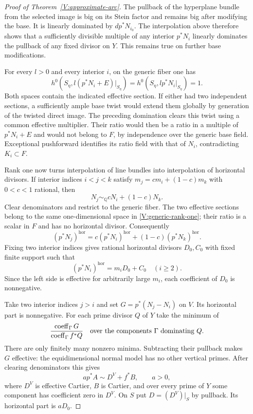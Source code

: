 \begin{proof}[Proof of Theorem~\ref{V:approximate-arc}]
The pullback of the hyperplane bundle from the selected image is big
on its Stein factor and remains big after modifying the base.  It is
linearly dominated by $d p^*N_{i_0}$.  The interpolation above therefore
shows that a sufficiently divisible multiple of any interior
$p^*N_i$ linearly dominates the pullback of any fixed divisor on $Y$.
This remains true on further base modifications.

For every $l>0$ and every interior $i$, on the generic fiber one has
\begin{equation}\label{V:generic-rank-one}
 h^0(S_\eta,l(p^*N_i+E)|_{S_\eta})
 =h^0(S_\eta,lp^*N_i|_{S_\eta})=1.
\end{equation}
Both spaces contain the indicated effective section.  If either had
two independent sections, a sufficiently ample base twist would extend
them globally by generation of the twisted direct image.  The preceding
domination clears this twist using a common effective multiplier.
Their ratio would then be a ratio in a multiple of $p^*N_i+E$ and
would not belong to $F$, by independence over the generic base field.
Exceptional pushforward identifies its ratio field with that of $N_i$,
contradicting $K_i\subset F$.

Rank one now turns interpolation of line bundles into interpolation
of horizontal divisors.  If interior indices $i<j<k$ satisfy
$m_j=c m_i+(1-c)m_k$ with $0<c<1$ rational, then
\[
 N_j\sim_{\mathbb Q}cN_i+(1-c)N_k.
\]
Clear denominators and restrict to the generic fiber.  The two effective
sections belong to the same one-dimensional space in
\eqref{V:generic-rank-one}; their ratio is a scalar in $F$ and has
no horizontal divisor.  Consequently
\[
 (p^*N_j)^{\mathrm{hor}}
 =c(p^*N_i)^{\mathrm{hor}}+(1-c)(p^*N_k)^{\mathrm{hor}}.
\]
Fixing two interior indices gives rational horizontal divisors $D_0,C_0$
with fixed finite support such that
\[
 (p^*N_i)^{\mathrm{hor}}=m_iD_0+C_0\quad(i\ge2).
\]
Since the left side is effective for arbitrarily large $m_i$, each
coefficient of $D_0$ is nonnegative.

Take two interior indices $j>i$ and set $G=p^*(N_j-N_i)$ on $V$.
Its horizontal part is nonnegative.  For each prime divisor $Q$ of $Y$
take the minimum of
\[
 \frac{\operatorname{coeff}_{\Gamma}G}
      {\operatorname{coeff}_{\Gamma}f^*Q}
 \quad\hbox{over the components $\Gamma$ dominating $Q$.}
\]
There are only finitely many nonzero minima.  Subtracting their
pullback makes $G$ effective: the equidimensional normal model has
no other vertical primes.  After clearing denominators this gives
\begin{equation}\label{V:base-decomposition}
 a p^*A\sim D^V+f^*B,\qquad a>0,
\end{equation}
where $D^V$ is effective Cartier, $B$ is Cartier, and over every prime
of $Y$ some component has coefficient zero in $D^V$.  On $S$ put
$D=(D^V)|_S$ by pullback.  Its horizontal part is $aD_0$.


\end{proof}
